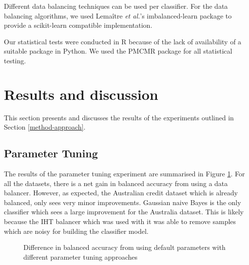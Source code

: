 \documentclass{sig-alternate-05-2015}
\begin{document}
	Different data balancing techniques can be used per classifier. For the data balancing algorithms, we used Lema\^{i}tre \textit{et al.}'s \cite{lemaitre2016imbalanced} imbalanced-learn package to provide a scikit-learn compatible implementation.
	
	Our statistical tests were conducted in R because of the lack of availability of a suitable package in Python. We used the PMCMR \cite{pmcmr} package for all statistical testing.
	
	\section{Results and discussion}
	\label{results}
	This section presents and discusses the results of the experiments outlined in Section \ref{method-approach}.
	\subsection{Parameter Tuning}
	The results of the parameter tuning experiment are summarised in Figure \ref{fig:parameter_tuning}. For all the datasets, there is a net gain in balanced accuracy from using a data balancer. However, as expected, the Australian credit dataset which is already balanced, only sees very minor improvements. Gaussian naive Bayes is the only classifier which sees a large improvement for the Australia dataset. This is likely because the IHT balancer which was used with it was able to remove samples which are noisy for building the classifier model. 
	
	\begin{figure}
		\centering
		\vspace{-1em}
		\caption{Difference in balanced accuracy from using default parameters with different parameter tuning approaches}
		\label{fig:parameter_tuning}
		\vspace{-1em}
	\end{figure}
	
\end{document}
